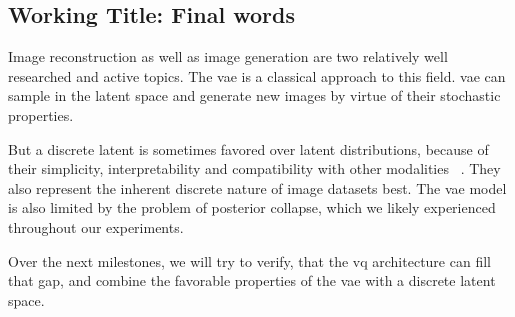 \subsection{Working Title: Final words}\label{subsec:final-words}
Image reconstruction as well as image generation are two relatively well researched and active topics.
The \ac{vae} is a classical approach to this field.
\ac{vae} can sample in the latent space and generate new images by virtue of their stochastic properties.

But a discrete latent is sometimes favored over latent distributions, because of their simplicity, interpretability
and compatibility with other modalities ~\cite{vqvae}.
They also represent the inherent discrete nature of image datasets best.
The \ac{vae} model is also limited by the problem of posterior collapse, which we likely experienced throughout our
experiments.

Over the next milestones, we will try to verify, that the \ac{vq} architecture can fill that gap, and combine the
favorable properties of the \ac{vae} with a discrete latent space.